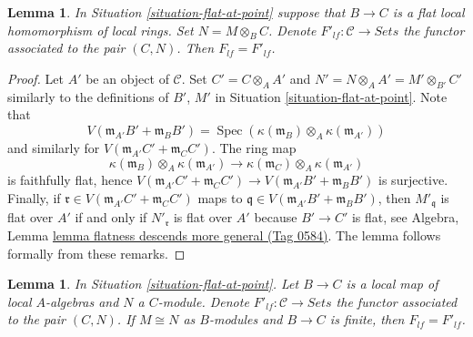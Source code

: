 \documentclass{amsart}
\theoremstyle{plain}
\newtheorem{lemma}[subsection]{Lemma}
\theoremstyle{definition}
\theoremstyle{remark}
\numberwithin{equation}{subsection}
\def\Spec{\mathop{\mathrm{Spec}}}
\begin{document}
\begin{lemma}
\label{lemma-flat-at-point-go-up}
In
Situation \ref{situation-flat-at-point}
suppose that $B \to C$ is a flat local homomorphism of local
rings. Set $N = M \otimes_B C$. Denote
$F'_{lf} : \mathcal{C} \to \textit{Sets}$ the functor associated
to the pair $(C, N)$. Then $F_{lf} = F'_{lf}$.
\end{lemma}

\begin{proof}
Let $A'$ be an object of $\mathcal{C}$. Set $C' = C \otimes_A A'$
and $N' = N \otimes_A A' = M' \otimes_{B'} C'$ similarly to the definitions
of $B'$, $M'$ in
Situation \ref{situation-flat-at-point}. Note that
$$
V(\mathfrak m_{A'}B' + \mathfrak m_B B')
=
\Spec( \kappa(\mathfrak m_B) \otimes_A \kappa(\mathfrak m_{A'}) )
$$
and similarly for $V(\mathfrak m_{A'}C' + \mathfrak m_C C')$.
The ring map
$$
\kappa(\mathfrak m_B) \otimes_A \kappa(\mathfrak m_{A'})
\longrightarrow
\kappa(\mathfrak m_C) \otimes_A \kappa(\mathfrak m_{A'})
$$
is faithfully flat, hence
$V(\mathfrak m_{A'}C' + \mathfrak m_C C') \to
V(\mathfrak m_{A'}B' + \mathfrak m_B B')$ is surjective.
Finally, if $\mathfrak r \in V(\mathfrak m_{A'}C' + \mathfrak m_C C')$
maps to $\mathfrak q \in V(\mathfrak m_{A'}B' + \mathfrak m_B B')$, then
$M'_{\mathfrak q}$ is flat over $A'$ if and only if
$N'_{\mathfrak r}$ is flat over $A'$ because $B' \to C'$ is flat, see
Algebra, Lemma \href{https://stacks.math.columbia.edu/tag/0584}{lemma flatness descends more general (Tag 0584)}.
The lemma follows formally from these remarks.
\end{proof}


\begin{lemma}
\label{lemma-flat-at-point-finite}
In Situation \ref{situation-flat-at-point}. Let $B \to C$ is a local map of
local $A$-algebras and $N$ a $C$-module. Denote
$F'_{lf} : \mathcal{C} \to \textit{Sets}$ the functor associated to the pair
$(C, N)$. If $M \cong N$ as $B$-modules and $B \to C$ is finite, then
$F_{lf} = F'_{lf}$.
\end{lemma}
\end{document}
